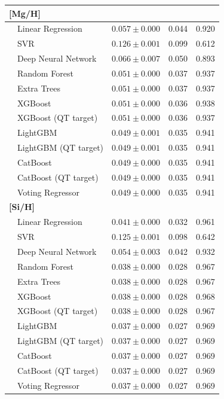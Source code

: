 \documentclass{aa}
\begin{document}
\begin{appendix}
\begin{table}
\begin{tabular}{llccc}
\multicolumn{5}{l}{\textbf{[Mg/H]}} \\
\hline
 & Linear Regression & $0.057 \pm 0.000$ & 0.044 & 0.920 \\
 & SVR & $0.126 \pm 0.001$ & 0.099 & 0.612 \\
 & Deep Neural Network & $0.066 \pm 0.007$ & 0.050 & 0.893 \\
 & Random Forest & $0.051 \pm 0.000$ & 0.037 & 0.937 \\
 & Extra Trees & $0.051 \pm 0.000$ & 0.037 & 0.937 \\
 & XGBoost & $0.051 \pm 0.000$ & 0.036 & 0.938 \\
 & XGBoost (QT target) & $0.051 \pm 0.000$ & 0.036 & 0.937 \\
 & LightGBM & $\mathbf{0.049 \pm 0.001}$ & 0.035 & 0.941 \\
 & LightGBM (QT target) & $0.049 \pm 0.001$ & 0.035 & 0.941 \\
 & CatBoost & $0.049 \pm 0.000$ & 0.035 & 0.941 \\
 & CatBoost (QT target) & $0.049 \pm 0.000$ & 0.035 & 0.941 \\
 & Voting Regressor & $0.049 \pm 0.000$ & 0.035 & 0.941 \\
\hline

\multicolumn{5}{l}{\textbf{[Si/H]}} \\
\hline
 & Linear Regression & $0.041 \pm 0.000$ & 0.032 & 0.961 \\
 & SVR & $0.125 \pm 0.001$ & 0.098 & 0.642 \\
 & Deep Neural Network & $0.054 \pm 0.003$ & 0.042 & 0.932 \\
 & Random Forest & $0.038 \pm 0.000$ & 0.028 & 0.967 \\
 & Extra Trees & $0.038 \pm 0.000$ & 0.028 & 0.967 \\
 & XGBoost & $0.038 \pm 0.000$ & 0.028 & 0.968 \\
 & XGBoost (QT target) & $0.038 \pm 0.000$ & 0.028 & 0.967 \\
 & LightGBM & $\mathbf{0.037 \pm 0.000}$ & 0.027 & 0.969 \\
 & LightGBM (QT target) & $0.037 \pm 0.000$ & 0.027 & 0.969 \\
 & CatBoost & $0.037 \pm 0.000$ & 0.027 & 0.969 \\
 & CatBoost (QT target) & $0.037 \pm 0.000$ & 0.027 & 0.969 \\
 & Voting Regressor & $0.037 \pm 0.000$ & 0.027 & 0.969 \\
\hline


\end{tabular}
\end{table}
\end{appendix}
\end{document}
